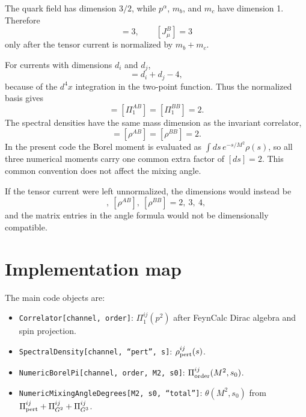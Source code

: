 \documentclass[11pt]{article}
\begin{document}
The quark field has dimension $3/2$, while $p^\alpha$, $m_b$, and $m_c$ have
dimension 1.  Therefore
\begin{equation}
  [J^A_\mu]=3,
  \qquad
  [J^B_\mu]=3
\end{equation}
only after the tensor current is normalized by $m_b+m_c$.

For currents with dimensions $d_i$ and $d_j$,
\begin{equation}
  [\Pi^{ij}_{\mu\nu}]
  =
  d_i+d_j-4,
\end{equation}
because of the $d^4x$ integration in the two-point function.  Thus the
normalized basis gives
\begin{equation}
  [\Pi^{AA}_1]=[\Pi^{AB}_1]=[\Pi^{BB}_1]=2.
\end{equation}
The spectral densities have the same mass dimension as the invariant
correlator,
\begin{equation}
  [\rho^{AA}]=[\rho^{AB}]=[\rho^{BB}]=2.
\end{equation}
In the present code the Borel moment is evaluated as
$\int ds\,e^{-s/M^2}\rho(s)$, so all three numerical moments carry one common
extra factor of $[ds]=2$.  This common convention does not affect the mixing
angle.

If the tensor current were left unnormalized, the dimensions would instead be
\begin{equation}
  [\rho^{AA}],\ [\rho^{AB}],\ [\rho^{BB}]
  =
  2,\ 3,\ 4,
\end{equation}
and the matrix entries in the angle formula would not be dimensionally
compatible.

\section{Implementation map}

The main code objects are:
\begin{itemize}
  \item \texttt{Correlator[channel, order]}:
  $\Pi_1^{ij}(p^2)$ after FeynCalc Dirac algebra and spin projection.
  \item \texttt{SpectralDensity[channel, ``pert'', s]}:
  $\rho_{\rm pert}^{ij}(s)$.
  \item \texttt{NumericBorelPi[channel, order, M2, s0]}:
  $\Pi^{ij}_{\rm order}(M^2,s_0)$.
  \item \texttt{NumericMixingAngleDegrees[M2, s0, ``total'']}:
  $\theta(M^2,s_0)$ from
  $\Pi_{\rm pert}^{ij}+\Pi_{G^2}^{ij}+\Pi_{G^3}^{ij}$.
\end{itemize}
\end{document}
